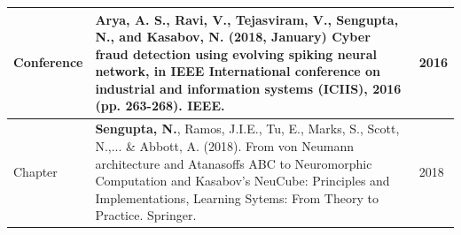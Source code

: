 \begin{table}
\begin{tabular}{@{}p{2cm}p{12cm}p{1cm}@{}}
			Conference & Arya, A. S., Ravi, V., Tejasviram, V., \textbf{Sengupta, N.}, and Kasabov, N. (2018, January) Cyber fraud detection using evolving spiking neural network, in IEEE International conference on industrial and information systems (ICIIS), 2016 (pp. 263-268). IEEE. & \multicolumn{1}{c}{2016} \\ \midrule
			
			Chapter & \textbf{Sengupta, N.}, Ramos, J.I.E., Tu, E., Marks, S., Scott, N.,... \& Abbott, A. (2018). From von Neumann architecture and Atanasoffs ABC to Neuromorphic Computation and Kasabov’s NeuCube: Principles and Implementations, Learning Sytems: From Theory to Practice. Springer. & 2018 \\ \bottomrule \bottomrule
	\end{tabular}
\end{table}












